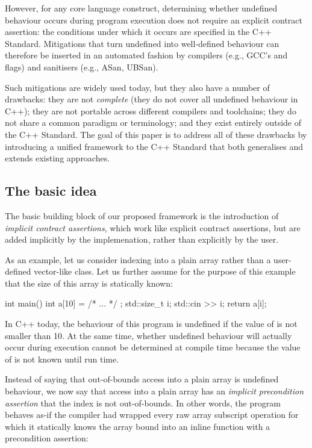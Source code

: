 However, for any core language construct, determining whether undefined behaviour occurs during program execution does not require an explicit contract assertion: the conditions under which it occurs are specified in the C++ Standard. Mitigations that turn undefined into well-defined behaviour can therefore be inserted in an automated fashion by compilers (e.g., GCC's  and  flags) and sanitisers (e.g., ASan, UBSan).

Such mitigations are widely used today, but they also have a number of drawbacks: they are not \emph{complete} (they do not cover all undefined behaviour in C++); they are not portable across different compilers and toolchains; they do not share a common paradigm or terminology; and they exist entirely outside of the C++ Standard. The goal of this paper is to address all of these drawbacks by introducing a unified framework to the C++ Standard that both generalises and extends existing approaches.

\subsection{The basic idea}

The basic building block of our proposed framework is the introduction of \emph{implicit contract assertions}, which work like explicit contract assertions, but are added implicitly by the implemenation, rather than explicitly by the user.

As an example, let us consider indexing into a plain array rather than a user-defined vector-like class. Let us further assume for the purpose of this example that the size  of this array is statically known:

\begin{codeblock}
int main() {
int a[10] = { /* ... */ };
std::size_t i; std::cin >> i;
return a[i];
}
\end{codeblock}

In C++ today, the behaviour of this program is undefined if the value of  is not smaller than 10. At the same time, whether undefined behaviour will actually occur during execution cannot be determined at compile time because the value of  is not known until run time.

Instead of saying that out-of-bounds access into a plain array is undefined behaviour, we now say that access into a plain array has an \emph{implicit precondition assertion} that the index is not out-of-bounds. In other words, the program behaves as-if the compiler had wrapped every raw array subscript operation for which it statically knows the array bound  into an inline function with a precondition assertion:

